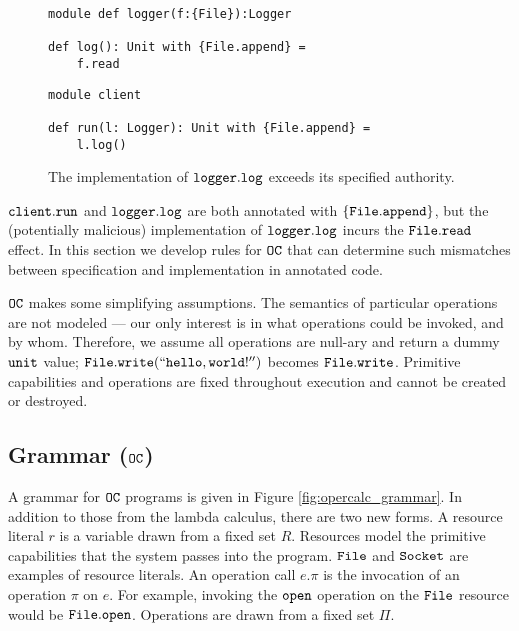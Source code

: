 \begin{figure}[h]
\vspace{-5pt}

\begin{lstlisting}
module def logger(f:{File}):Logger

def log(): Unit with {File.append} =
    f.read
\end{lstlisting}

\begin{lstlisting}
module client

def run(l: Logger): Unit with {File.append} =
    l.log()
\end{lstlisting}

\vspace{-7pt}
\caption{The implementation of $\mathtt{logger.log}$ exceeds its specified authority.}
\label{fig:opercalc_motivating}
\end{figure}

$\mathtt{client.run}$ and $\mathtt{logger.log}$ are both annotated with $\{ \mathtt{File.append} \}$, but the (potentially malicious) implementation of $\mathtt{logger.log}$ incurs the $\mathtt{File.read}$ effect.
In this section we develop rules for $\mathtt{OC}$ that can determine such mismatches between specification and implementation in annotated code.

$\mathtt{OC}$ makes some simplifying assumptions.
The semantics of particular operations are not modeled --- our only interest is in what operations could be invoked, and by whom.
Therefore, we assume all operations are null-ary and return a dummy $\mathtt{unit}$ value; $\mathtt{File.write(``hello, world!'')}$ becomes $\mathtt{File.write}$.
Primitive capabilities and operations are fixed throughout execution and cannot be created or destroyed.

\subsection{Grammar ($\mathtt{OC}$)}

A grammar for $\mathtt{OC}$ programs is given in Figure \ref{fig:opercalc_grammar}. In addition to those from the lambda calculus, there are two new forms. A resource literal $r$ is a variable drawn from a fixed set $R$. Resources model the primitive capabilities that the system passes into the program. $\mathtt{File}$ and $\mathtt{Socket}$ are examples of resource literals. An operation call $e.\pi$ is the invocation of an operation $\pi$ on $e$. For example, invoking the $\mathtt{open}$ operation on the $\mathtt{File}$ resource would be $\mathtt{File.open}$. Operations are drawn from a fixed set $\Pi$.

